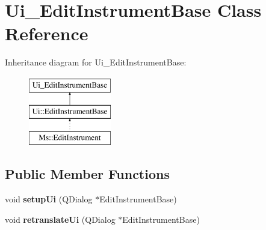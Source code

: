\hypertarget{class_ui___edit_instrument_base}{}\section{Ui\+\_\+\+Edit\+Instrument\+Base Class Reference}
\label{class_ui___edit_instrument_base}
Inheritance diagram for Ui\+\_\+\+Edit\+Instrument\+Base\+:\begin{figure}[H]
\begin{center}
\leavevmode
\includegraphics[height=3.000000cm]{class_ui___edit_instrument_base}
\end{center}
\end{figure}
\subsection*{Public Member Functions}
\begin{DoxyCompactItemize}
\item 
\mbox{\label{class_ui___edit_instrument_base_ab69dd4a0e30e46fc1ac626235cd64e47}} 
void {\bfseries setup\+Ui} (Q\+Dialog $\ast$Edit\+Instrument\+Base)
\item 
\mbox{\label{class_ui___edit_instrument_base_ad418a93fe511bd7dade672bea8a791a4}} 
void {\bfseries retranslate\+Ui} (Q\+Dialog $\ast$Edit\+Instrument\+Base)
\end{DoxyCompactItemize}
